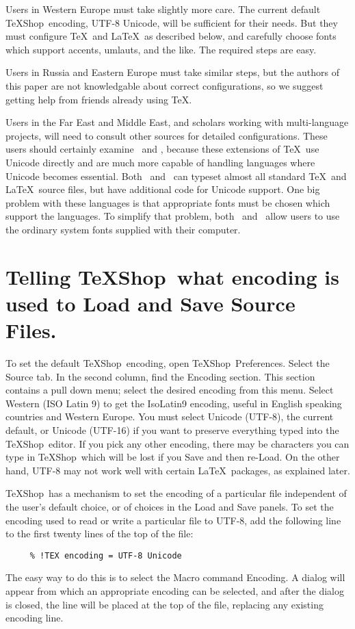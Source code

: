 \documentclass[letterpaper,11pt]{article}
\newcommand{\TS}{\textsf{\TeX Shop}}
\newcommand{\acr}[1]{\textsf{#1}}
\newcommand{\cmd}[1]{\textsf{#1}}
\begin{document}
Users in Western Europe must take slightly more care. The current default \TS\ encoding,
\acr{UTF-8 Unicode}, will be sufficient for their needs. But they must configure \TeX\ and \LaTeX\ as described below, and carefully choose fonts which support accents, umlauts, and the like.
The required steps are easy.

Users in Russia and Eastern Europe must take similar steps, but the authors of this paper
are not knowledgable about correct configurations, so we suggest getting help from
friends already using \TeX.

Users in the Far East and Middle East, and scholars working with multi-language projects,
will need to consult other sources for detailed configurations. These users should certainly
examine \XeTeX\ and \LuaTeX, because these extensions of \TeX\ use \cmd{Unicode} directly and are
much more capable of handling languages where \cmd{Unicode} becomes essential. Both \XeTeX\ and
\LuaTeX\ can typeset almost all standard \TeX\ and \LaTeX\ source files, but have additional
code for \cmd{Unicode} support. One big problem with these languages is that appropriate fonts must be chosen which support the languages. To simplify that problem,
both \XeTeX\ and \LuaTeX\ allow users to use the ordinary system fonts supplied with their computer.

\section{Telling \TS\ what encoding is used to Load and Save Source Files.}

To set the default \TS\ encoding, open \TS\ Preferences. Select the Source tab.
In the second column, find the Encoding section. This section contains a pull down menu;
select the desired encoding from this menu. Select \acr{Western (ISO Latin 9)} to get the \acr{IsoLatin9} encoding, useful in English speaking countries and Western Europe. You must select
\acr{Unicode (UTF-8)}, the current default, or \acr{Unicode (UTF-16)} if you want to preserve everything typed into the \TS\ editor. If you pick any other encoding, there may be characters you can type in \TS\
which will be lost if you Save and then re-Load. On the other hand, \acr{UTF-8} may not work well with certain \LaTeX\ packages, as explained later.

\TS\ has a mechanism to set the encoding of a particular file independent of the user's default choice, or of choices in the Load and Save panels. To set the encoding used to read or write a particular file to \acr{UTF-8}, add the following line to the first twenty lines of the top of the file:
\begin{verbatim}
     % !TEX encoding = UTF-8 Unicode
\end{verbatim}
The easy way to do this is to select the Macro command \cmd{Encoding}. A dialog will appear from which an appropriate encoding can be selected, and after the dialog is closed, the line will be placed at the top of the file, replacing any existing encoding line.
\end{document}
